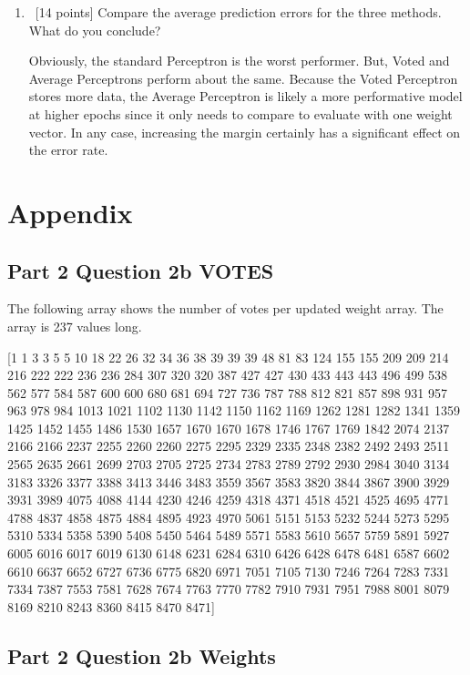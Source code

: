 \documentclass[12pt, fullpage,letterpaper]{article}
\begin{document}
\begin{enumerate}
\begin{enumerate}
	\item~[14 points] Compare the average prediction errors for the three methods. What do you conclude? 
	
	Obviously, the standard Perceptron is the worst performer. But, Voted and Average Perceptrons perform about the same. Because the Voted Perceptron stores more data, the Average Perceptron is likely a more performative model at higher epochs since it only needs to compare to evaluate with one weight vector. In any case, increasing the margin certainly has a significant effect on the error rate.
	
\end{enumerate}

\section{Appendix}

\subsection{Part 2 Question 2b VOTES}

The following array shows the number of votes per updated weight array. The array is 237 values long.

[1 1 3 3 5 5 10 18 22 26 32 34 36 38 39 39 39 48 81 83 124 155 155 209 209 214 216 222 222 236 236 284 307 320 320 387 427 427 430 433 443 443 496 499 538 562 577 584 587 600 600 680 681 694 727 736 787 788 812 821 857 898 931 957 963 978 984 1013 1021 1102 1130 1142 1150 1162 1169 1262 1281 1282 1341 1359 1425 1452 1455 1486 1530 1657 1670 1670 1678 1746 1767 1769 1842 2074 2137 2166 2166 2237 2255 2260 2260 2275 2295 2329 2335 2348 2382 2492 2493 2511 2565 2635 2661 2699 2703 2705 2725 2734 2783 2789 2792 2930 2984 3040 3134 3183 3326 3377 3388 3413 3446 3483 3559 3567 3583 3820 3844 3867 3900 3929 3931 3989 4075 4088 4144 4230 4246 4259 4318 4371 4518 4521 4525 4695 4771 4788 4837 4858 4875 4884 4895 4923 4970 5061 5151 5153 5232 5244 5273 5295 5310 5334 5358 5390 5408 5450 5464 5489 5571 5583 5610 5657 5759 5891 5927 6005 6016 6017 6019 6130 6148 6231 6284 6310 6426 6428 6478 6481 6587 6602 6610 6637 6652 6727 6736 6775 6820 6971 7051 7105 7130 7246 7264 7283 7331 7334 7387 7553 7581 7628 7674 7763 7770 7782 7910 7931 7951 7988 8001 8079 8169 8210 8243 8360 8415 8470 8471]

\subsection{Part 2 Question 2b Weights}


\end{enumerate}
\end{document}

